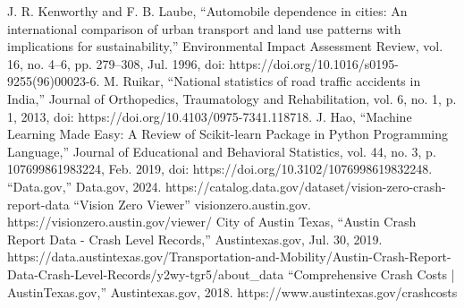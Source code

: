 \documentclass[conference]{IEEEtran}
\begin{document}
\begin{thebibliography}{00}
J. R. Kenworthy and F. B. Laube, “Automobile dependence in cities: An international comparison of urban transport and land use patterns with implications for sustainability,” Environmental Impact Assessment Review, vol. 16, no. 4–6, pp. 279–308, Jul. 1996, doi: https://doi.org/10.1016/s0195-9255(96)00023-6.
M. Ruikar, “National statistics of road traffic accidents in India,” Journal of Orthopedics, Traumatology and Rehabilitation, vol. 6, no. 1, p. 1, 2013, doi: https://doi.org/10.4103/0975-7341.118718.
J. Hao, “Machine Learning Made Easy: A Review of Scikit-learn Package in Python Programming Language,” Journal of Educational and Behavioral Statistics, vol. 44, no. 3, p. 107699861983224, Feb. 2019, doi: https://doi.org/10.3102/1076998619832248.
“Data.gov,” Data.gov, 2024. https://catalog.data.gov/dataset/vision-zero-crash-report-data
“Vision Zero Viewer” visionzero.austin.gov. https://visionzero.austin.gov/viewer/
City of Austin Texas, “Austin Crash Report Data - Crash Level Records,” Austintexas.gov, Jul. 30, 2019. https://data.austintexas.gov/Transportation-and-Mobility/Austin-Crash-Report-Data-Crash-Level-Records/y2wy-tgr5/about\_data
‌“Comprehensive Crash Costs | AustinTexas.gov,” Austintexas.gov, 2018. https://www.austintexas.gov/crashcosts

\end{thebibliography}
\end{document}
